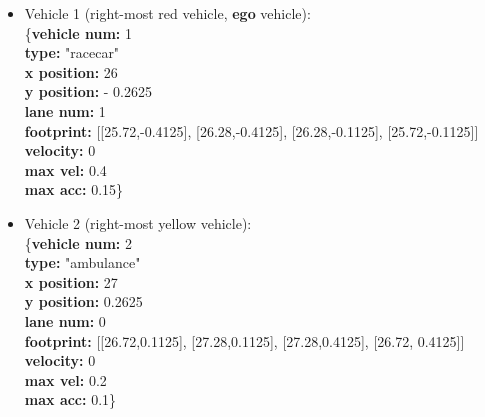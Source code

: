 \begin{itemize}
    \item Vehicle 1 (right-most red vehicle, \textbf{ego} vehicle):
    \\\hspace*{7.5mm} \{\textbf{vehicle num:} 1
    \\\hspace*{10mm} \textbf{type:} "racecar"
    \\\hspace*{10mm} \textbf{x position:} 26
    \\\hspace*{10mm} \textbf{y position:} - 0.2625
    \\\hspace*{10mm} \textbf{lane num:} 1
    \\\hspace*{10mm} \textbf{footprint:} [[25.72,-0.4125], [26.28,-0.4125], [26.28,-0.1125], [25.72,-0.1125]]
    \\\hspace*{10mm} \textbf{velocity:} 0
    \\\hspace*{10mm} \textbf{max vel:} 0.4
    \\\hspace*{10mm} \textbf{max acc:} 0.15\}
    
    \item Vehicle 2 (right-most yellow vehicle):
    \\\hspace*{7.5mm} \{\textbf{vehicle num:} 2
    \\\hspace*{10mm} \textbf{type:} "ambulance"
    \\\hspace*{10mm} \textbf{x position:} 27
    \\\hspace*{10mm} \textbf{y position:} 0.2625
    \\\hspace*{10mm} \textbf{lane num:} 0
    \\\hspace*{10mm} \textbf{footprint:} [[26.72,0.1125], [27.28,0.1125], [27.28,0.4125], [26.72, 0.4125]]
    \\\hspace*{10mm} \textbf{velocity:} 0
    \\\hspace*{10mm} \textbf{max vel:} 0.2
    \\\hspace*{10mm} \textbf{max acc:} 0.1\}
    

\end{itemize}
